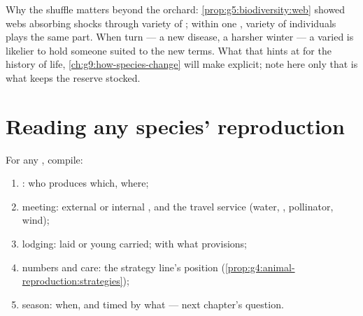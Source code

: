 \begin{remark}\label{rem:g8:sexual-reproduction:reserve}
Why the shuffle matters beyond the orchard:
\cref{prop:g5:biodiversity:web} showed webs absorbing
shocks through variety of ; within one ,
variety of individuals plays the same part. When
 turn --- a new disease, a harsher winter --- a
varied  is likelier to hold someone suited to the
new terms. What that hints at for the history of life,
\cref{ch:g9:how-species-change} will make explicit; note
here only that  is what keeps the
reserve stocked.
\end{remark}

\section{Reading any species' reproduction}

\begin{method}\label{met:g8:sexual-reproduction:dossier}
For any , compile:
\begin{enumerate}
  \item {}: who produces which, where;
  \item meeting: external or internal , and
        the travel service (water, , pollinator,
        wind);
  \item lodging:  laid or young carried; with what
        provisions;
  \item numbers and care: the strategy line's position
        (\cref{prop:g4:animal-reproduction:strategies});
  \item season: when, and timed by what --- next
        chapter's question.
\end{enumerate}
\end{method}


